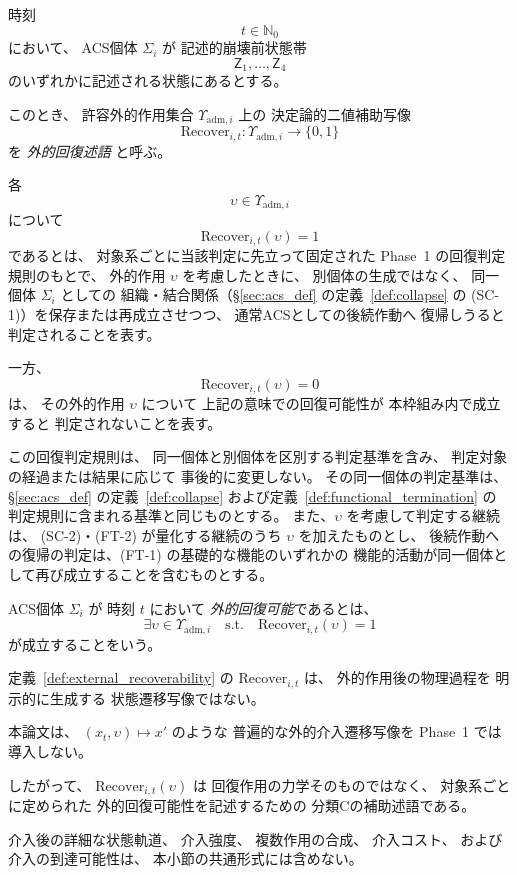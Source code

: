 \begin{definition}
\label{def:external_recoverability}
時刻
\[
  t\in\mathbb{N}_0
\]
において、
ACS個体 $\Sigma_i$ が
記述的崩壊前状態帯
\[
  \mathsf{Z}_1,\ldots,\mathsf{Z}_4
\]
のいずれかに記述される状態にあるとする。

このとき、
許容外的作用集合
$\Upsilon_{\mathrm{adm},i}$ 上の
決定論的二値補助写像
\[
  \mathrm{Recover}_{i,t}:
  \Upsilon_{\mathrm{adm},i}
  \longrightarrow
  \{0,1\}
\]
を
\emph{外的回復述語}
と呼ぶ。

各
\[
  \upsilon\in\Upsilon_{\mathrm{adm},i}
\]
について
\[
  \mathrm{Recover}_{i,t}(\upsilon)=1
\]
であるとは、
対象系ごとに当該判定に先立って固定された
Phase~1 の回復判定規則のもとで、
外的作用 $\upsilon$ を考慮したときに、
別個体の生成ではなく、
同一個体 $\Sigma_i$ としての
組織・結合関係（\S\ref{sec:acs_def} の定義~\ref{def:collapse} の (SC-1)）を保存または再成立させつつ、
通常ACSとしての後続作動へ
復帰しうると判定されることを表す。

一方、
\[
  \mathrm{Recover}_{i,t}(\upsilon)=0
\]
は、
その外的作用 $\upsilon$ について
上記の意味での回復可能性が
本枠組み内で成立すると
判定されないことを表す。

この回復判定規則は、
同一個体と別個体を区別する判定基準を含み、
判定対象の経過または結果に応じて
事後的に変更しない。
その同一個体の判定基準は、
\S\ref{sec:acs_def} の定義~\ref{def:collapse} および定義~\ref{def:functional_termination} の
判定規則に含まれる基準と同じものとする。
また、$\upsilon$ を考慮して判定する継続は、
(SC-2)・(FT-2) が量化する継続のうち $\upsilon$ を加えたものとし、
後続作動への復帰の判定は、(FT-1) の基礎的な機能のいずれかの
機能的活動が同一個体として再び成立することを含むものとする。

ACS個体 $\Sigma_i$ が
時刻 $t$ において
\emph{外的回復可能}であるとは、
\[
  \exists\upsilon\in\Upsilon_{\mathrm{adm},i}
  \quad\text{s.t.}\quad
  \mathrm{Recover}_{i,t}(\upsilon)=1
\]
が成立することをいう。
\end{definition}

\begin{remark}[外的回復述語は外的介入動学そのものではない]
\label{rem:recover_not_intervention_dynamics}
定義~\ref{def:external_recoverability} の
$\mathrm{Recover}_{i,t}$ は、
外的作用後の物理過程を
明示的に生成する
状態遷移写像ではない。

本論文は、
$(x_t,\upsilon) \longmapsto x'$
のような
普遍的な外的介入遷移写像を
Phase~1 では導入しない。

したがって、
$\mathrm{Recover}_{i,t}(\upsilon)$ は
回復作用の力学そのものではなく、
対象系ごとに定められた
外的回復可能性を記述するための
分類Cの補助述語である。

介入後の詳細な状態軌道、
介入強度、
複数作用の合成、
介入コスト、
および介入の到達可能性は、
本小節の共通形式には含めない。
\end{remark}

